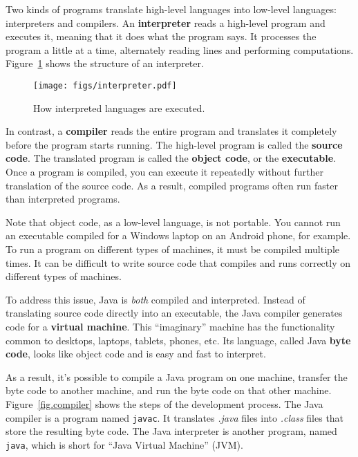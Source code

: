 Two kinds of programs translate high-level languages into low-level languages: interpreters and compilers.
An {\bf interpreter} reads a high-level program and executes it, meaning that it does what the program says.
It processes the program a little at a time, alternately reading lines and performing computations.
Figure~\ref{fig.interpreter} shows the structure of an interpreter.

\begin{figure}[!ht]
\begin{center}
\texttt{[image: figs/interpreter.pdf]}
\caption{How interpreted languages are executed.}
\label{fig.interpreter}
\end{center}
\end{figure}


In contrast, a {\bf compiler} reads the entire program and translates it completely before the program starts running.
The high-level program is called the {\bf source code}.
The translated program is called the {\bf object code}, or the {\bf executable}.
Once a program is compiled, you can execute it repeatedly without further translation of the source code.
As a result, compiled programs often run faster than interpreted programs.

Note that object code, as a low-level language, is not portable.
You cannot run an executable compiled for a Windows laptop on an Android phone, for example.
To run a program on different types of machines, it must be compiled multiple times.
It can be difficult to write source code that compiles and runs correctly on different types of machines.


To address this issue, Java is {\em both} compiled and interpreted.
Instead of translating source code directly into an executable, the Java compiler generates code for a {\bf virtual machine}.
This ``imaginary'' machine has the functionality common to desktops, laptops, tablets, phones, etc.
Its language, called Java {\bf byte code}, looks like object code and is easy and fast to interpret.


As a result, it's possible to compile a Java program on one machine, transfer the byte code to another machine, and run the byte code on that other machine.
Figure~\ref{fig.compiler} shows the steps of the development process.
The Java compiler is a program named {\tt javac}.
It translates {\it .java} files into {\it .class} files that store the resulting byte code.
The Java interpreter is another program, named {\tt java}, which is short for ``Java Virtual Machine'' (JVM).

